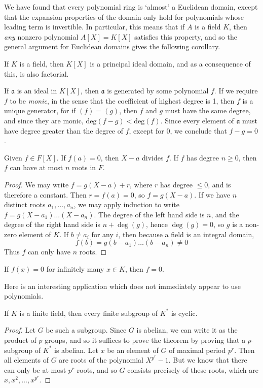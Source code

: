 We have found that every polynomial ring is `almost' a Euclidean domain, except that the expansion properties of the domain only hold for polynomials whose leading term is invertible. In particular, this means that if $A$ is a field $K$, then {\it any} nonzero polynomial $A[X] = K[X]$ satisfies this property, and so the general argument for Euclidean domains gives the following corollary.

\begin{corollary}
    If $K$ is a field, then $K[X]$ is a principal ideal domain, and as a consequence of this, is also factorial.
\end{corollary}

If $\mathfrak{a}$ is an ideal in $K[X]$, then $\mathfrak{a}$ is generated by some polynomial $f$. If we require $f$ to be {\it monic}, in the sense that the coefficient of highest degree is 1, then $f$ is a unique generator, for if $(f) = (g)$, then $f$ and $g$ must have the same degree, and since they are monic, $\text{deg}(f - g) < \text{deg}(f)$. Since every element of $\mathfrak{a}$ must have degree greater than the degree of $f$, except for $0$, we conclude that $f - g = 0$.

\begin{theorem}
    Given $f \in F[X]$. If $f(a) = 0$, then $X - a$ divides $f$. If $f$ has degree $n \geq 0$, then $f$ can have at most $n$ roots in $F$.
\end{theorem}
\begin{proof}
    We may write $f = g(X - a) + r$, where $r$ has degree $\leq 0$, and is therefore a constant. Then $r = f(a) = 0$, so $f = g(X - a)$. If we have $n$ distinct roots $a_1, \dots, a_n$, we may apply induction to write $f = g (X - a_1) \dots (X - a_n)$. The degree of the left hand side is $n$, and the degree of the right hand side is $n + \deg(g)$, hence $\deg(g) = 0$, so $g$ is a non-zero element of $K$. If $b \neq a_i$ for any $i$, then because a field is an integral domain,
    \[ f(b) = g(b - a_1) \dots (b - a_n) \neq 0 \]
    Thus $f$ can only have $n$ roots.
\end{proof}

\begin{corollary}
	If $f(x) = 0$ for infinitely many $x \in K$, then $f = 0$.
\end{corollary}

Here is an interesting application which does not immediately appear to use polynomials.

\begin{theorem}
	If $K$ is a finite field, then every finite subgroup of $K^*$ is cyclic.
\end{theorem}
\begin{proof}
	Let $G$ be such a subgroup. Since $G$ is abelian, we can write it as the product of $p$ groups, and so it suffices to prove the theorem by proving that a $p$-subgroup of $K^*$ is abelian. Let $x$ be an element of $G$ of maximal period $p^r$. Then all elements of $G$ are roots of the polynomial $X^{p^r} - 1$. But we know that there can only be at most $p^r$ roots, and so $G$ consists precisely of these roots, which are $x, x^2, \dots, x^{p^r}$.
\end{proof}


